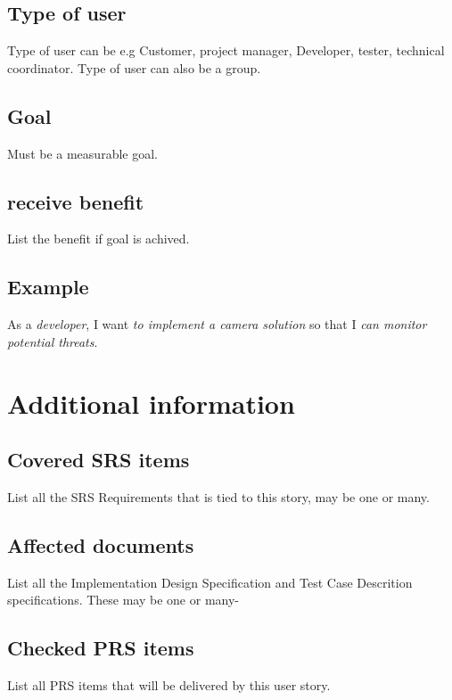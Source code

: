 \documentclass[a4paper]{article}
\begin{document}
	\subsection{Type of user}
	Type of user can be e.g Customer, project manager, Developer, tester, technical coordinator.
	Type of user can also be a group.

	\subsection{Goal}
	Must be a measurable goal.

	\subsection{receive benefit}
	List the benefit if goal is achived.

	\subsection{Example}
	As a \textit{developer}, I want \textit{to implement a camera solution} so that I \textit{can monitor potential threats}.
	
\section{Additional information}

	\subsection{Covered SRS items}
    List all the SRS Requirements that is tied to this story, may be one or many.
	\subsection{Affected documents}
    List all the Implementation Design Specification and Test Case Descrition specifications.
    These may be one or many-
	\subsection{Checked PRS items}
	List all PRS items that will be delivered by this user story.
\end{document}
